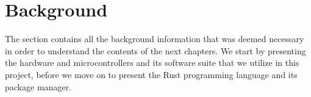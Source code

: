 
\chapter{Background}
\label{chap:background}

The section contains all the background information that was deemed necessary in order to understand the contents of the next chapters.
We start by presenting the hardware and microcontrollers and its software suite that we utilize in this project, before we move on to present the Rust programming language and its package manager.










